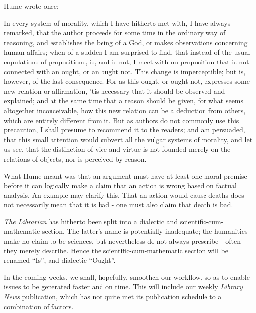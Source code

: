 \documentclass[11pt,a4paper]{report}
\begin{document}
\begin{multicols}{2}
	
Hume wrote once:

\begin{displayquote}

In every system of morality, which I have hitherto met with, I have
always remarked, that the author proceeds for some time in the ordinary
way of reasoning, and establishes the being of a God, or makes
observations concerning human affairs; when of a sudden I am surprised
to find, that instead of the usual copulations of propositions, is, and
is not, I meet with no proposition that is not connected with an ought,
or an ought not. This change is imperceptible; but is, however, of the
last consequence. For as this ought, or ought not, expresses some new
relation or affirmation, 'tis necessary that it should be observed and
explained; and at the same time that a reason should be given, for what
seems altogether inconceivable, how this new relation can be a deduction
from others, which are entirely different from it. But as authors do not
commonly use this precaution, I shall presume to recommend it to the
readers; and am persuaded, that this small attention would subvert all
the vulgar systems of morality, and let us see, that the distinction of
vice and virtue is not founded merely on the relations of objects, nor
is perceived by reason.

\end{displayquote}

What Hume meant was that an argument must have at least one moral
premise before it can logically make a claim that an action is wrong
based on factual analysis. An example may clarify this. That an action
would cause deaths does not necessarily mean that it is bad - one must
also claim that death is bad.

\textit{The Librarian} has hitherto been split into a dialectic and
scientific-cum-mathematic section. The latter's name is potentially
inadequate; the humanities make no claim to be sciences, but
nevertheless do not always prescribe - often they merely describe. Hence
the scientific-cum-mathematic section will be renamed ``Is'', and
dialectic ``Ought''.

In the coming weeks, we shall, hopefully, smoothen our workflow, so as
to enable issues to be generated faster and on time. This will include
our weekly \textit{Library News} publication, which has not quite met its
publication schedule to a combination of factors.


\end{multicols}
\end{document}
